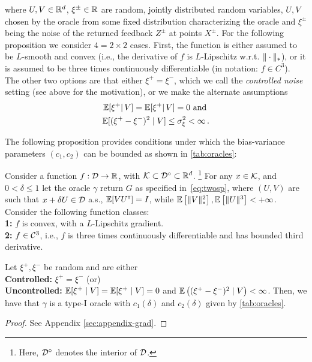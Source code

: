 where $U,V\in \mathbb{R}^d$, $\xi^{\pm}\in \mathbb{R}$ are random, jointly distributed random variables, $U,V$ chosen by the oracle
from some fixed distribution characterizing the oracle and $\xi^{\pm}$ being the noise of the returned feedback $Z^{\pm}$ at points $X^{\pm}$.
For the following proposition we consider $4=2\times 2$ cases.
First, the function is either assumed to be $L$-smooth and convex (i.e., the derivative of $f$ is $L$-Lipschitz w.r.t. $\|\cdot\|_*$), or it is assumed to be three times continuously differentiable (in notation: $f\in C^3$).
The other two options are that either $\xi^+=\xi^-$, which we call the \emph{controlled noise} setting (see above for the motivation), or we make the alternate assumptions 
\begin{align}
\begin{split}
\mathbb{E}[\xi^+ |\, V] = \mathbb{E}[\xi^+ |\, V] =0 \text{ and }\\
\mathbb{E} [ (\xi^{+} - \xi^-)^{2} \mid V] \le \sigma_\xi^2 <\infty\,.
\end{split}
\label{eq:noiseass}
\end{align}

The following proposition provides conditions under which the bias-variance parameters $(c_1,c_2)$ can be bounded as shown in \cref{tab:oracles}:
\begin{proposition}
\label{prop:grad-spsa}
Consider a function $f:\mathcal{D} \to \mathbb{R}$, with $\mathcal{K} \subset \mathcal{D}^\circ \subset \mathbb{R}^d$.%
\footnote{Here, $\mathcal{D}^\circ$ denotes the interior of $\mathcal{D}$.}
For any $x \in \mathcal{K}$, and $0< \delta \le 1$ let the oracle $\gamma$ return $G$ as specified in~\eqref{eq:twosp},
where $(U,V)$ are such that $x+\delta U \in \mathcal{D}$ a.s.,
$\mathbb{E}[V U^\mathsf{\scriptscriptstyle T}] = I$, while 
$\mathbb{E}\left[\|V\|_*^2\right], \mathbb{E}\left[ \|U\|^3 \right]<+\infty$.
Consider the following function classes:\\ 
\textbf{1:} $f$ is convex, with a $L$-Lipschitz gradient.\\
\textbf{2:} $f \in \mathcal{C}^3$, i.e., $f$ is three times continuously differentiable and has bounded third derivative.

Let $\xi^+, \xi^-$ be  random and are either \\
\textbf{Controlled:} $\xi^+= \xi^-$ (or)  \\
\textbf{Uncontrolled:} $\mathbb{E}[\xi^+ \mid V] = \mathbb{E}[\xi^+ \mid V] =0$ and $\mathbb{E} \left( (\xi^{+} - \xi^-)^{2} \mid V\right) < \infty$.
\fi
Then, we have that $\gamma$ is a type-I oracle with $c_1(\delta)$ and $c_2(\delta)$ given by \cref{tab:oracles}.
\end{proposition}
\begin{proof}
See Appendix \ref{sec:appendix-grad}.
\end{proof}

